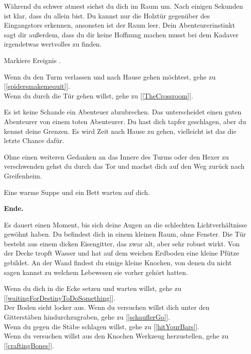 Während du schwer atmest siehst du dich im Raum um. Nach einigen Sekunden ist klar, dass du allein bist. Du kannst nur die Holztür gegenüber des Eingangstors erkennen, ansonsten ist der Raum leer. Dein Abenteurerinstinkt sagt dir außerdem, dass du dir keine Hoffnung machen musst bei dem Kadaver irgendetwas wertvolles zu finden.

Markiere Ereignis .

Wenn du den Turm verlassen und nach Hause gehen möchtest, gehe zu [\ref{spidersmakemequit}].
\\Wenn du durch die Tür gehen willst, gehe zu [\ref{TheCrossroom}].


Es ist keine Schande ein Abenteuer abzubrechen. Das unterscheidet einen guten Abenteurer von einem toten Abenteurer. Du hast dich tapfer geschlagen, aber du kennst deine Grenzen. Es wird Zeit nach Hause zu gehen, vielleicht ist das die letzte Chance dafür.

Ohne einen weiteren Gedanken an das Innere des Turms oder den Hexer zu verschwenden gehst du durch das Tor und machst dich auf den Weg zurück nach Greifenheim.

Eine warme Suppe und ein Bett warten auf dich.

\textbf{Ende.}


Es dauert einen Moment, bis sich deine Augen an die schlechten Lichtverhältnisse gewöhnt haben. Du befindest dich in einem kleinen Raum, ohne Fenster. Die Tür besteht aus einem dicken Eisengitter, das zwar alt, aber sehr robust wirkt. Von der Decke tropft Wasser und hat auf dem weichen Erdboden eine kleine Pfütze gebildet. An der Wand findest du einige kleine Knochen, von denen du nicht sagen kannst zu welchem Lebewesen sie vorher gehört hatten.

Wenn du dich in die Ecke setzen und warten willst, gehe zu [\ref{waitingForDestinyToDoSomething}].
\\Der Boden sieht locker aus. Wenn du versuchen willst dich unter den Gitterstäben hindurchzugraben, gehe zu [\ref{schauflerGo}].
\\Wenn du gegen die Stäbe schlagen willst, gehe zu [\ref{hitYourBars}].
\\Wenn du versuchen willst aus den Knochen Werkzeug herzustellen, gehe zu [\ref{craftingBones}].


